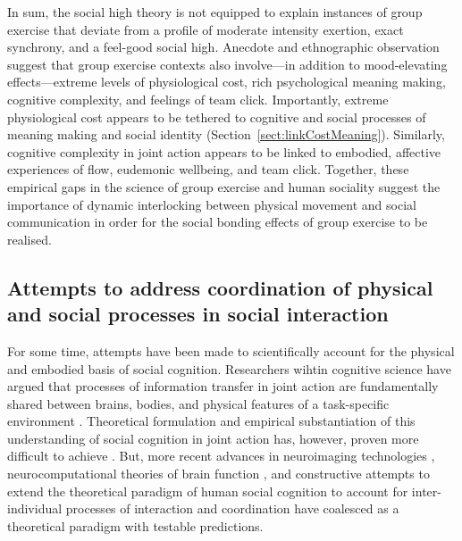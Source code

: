 \begin{CJK}{UTF8}{gbsn}
In sum, the social high theory is not equipped to explain instances of group exercise that deviate from a profile of moderate intensity exertion, exact synchrony, and a feel-good social high.  Anecdote and ethnographic observation suggest that group exercise contexts also involve---in addition to mood-elevating effects---extreme levels of physiological cost, rich psychological meaning making, cognitive complexity, and feelings of team click.  Importantly, extreme physiological cost appears to be tethered to cognitive and social processes of meaning making and social identity (Section~\ref{sect:linkCostMeaning}).  Similarly, cognitive complexity in joint action appears to be linked to embodied, affective experiences of flow, eudemonic wellbeing, and team click.  Together, these empirical gaps in the science of group exercise and human sociality suggest the importance of dynamic interlocking between physical movement and social communication in order for the social bonding effects of group exercise to be realised.



\subsection{Attempts to address coordination of physical and social processes in social interaction}

For some time, attempts have been made to scientifically account for the physical and embodied basis of social cognition.  Researchers wihtin cognitive science have argued that processes of information transfer in joint action are fundamentally shared between brains, bodies, and physical features of a task-specific environment \citep{Hutchins1995,Kirsh2006,Susi2001}.  Theoretical formulation and empirical substantiation of this understanding of social cognition in joint action has, however, proven more difficult to achieve \citep[due in part to the tendency of the MES and CR to preference the functional role of symbolic and amodal cognitive processes; see][]{Semin2008,Yufik2013}.
But, more recent advances in neuroimaging technologies \citep{Frith2007}, neurocomputational theories of brain function \citep{Friston2010,Frith2010,Yufik2013,Clark2013}, and constructive attempts to extend the theoretical paradigm of human social cognition to account for inter-individual processes of interaction and coordination \citep[e.g.][]{Sebanz2006,Semin2008,Dale2014} have coalesced as a theoretical paradigm with testable predictions.


\end{CJK}
